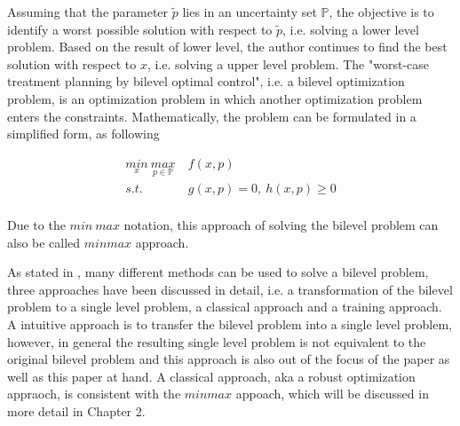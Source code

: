 Assuming that the parameter $\tilde{p}$ lies in an uncertainty set $\mathbb{P}$, the objective is to identify a worst possible solution with respect to $\tilde{p}$, i.e. solving a lower level problem. Based on the result of lower level, the author continues to find the best solution with respect to $x$, i.e. solving a upper level problem. The "worst-case treatment planning by bilevel optimal control", i.e. a  bilevel optimization problem, is an optimization problem in which another optimization problem enters the constraints. Mathematically, the problem can be formulated in a simplified form, as following




\begin{equation}
	\begin{aligned}
		\underset{x}{min} \   \underset{p \in \mathbb{P}}{max} & \  f(x,p) \\ 
		s.t.  & \  g(x, p) = 0, \  h(x,p)  \geq  0 \\
	\end{aligned}
\end{equation}


Due to the $min \ max$ notation, this approach of solving the bilevel problem can also be called $min max$ approach. 

As stated in \cite{MatSch22}, many different methods can be used to solve a bilevel problem, three approaches have been discussed in detail, i.e. a transformation of the bilevel problem to a single level problem, a classical approach and a training approach. A intuitive approach is to transfer the bilevel problem into a single level problem, however, in general the resulting single level problem is not equivalent to the original bilevel problem and this approach is also out of the focus of the paper \cite{MatSch22} as well as this paper at hand. A classical approach, aka a robust optimization appraoch, is consistent with the $minmax$ appoach, which will be discussed in more detail in Chapter 2.

